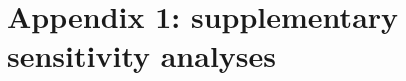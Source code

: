 \documentclass{jimis-en}
\begin{document}

















\appendix\footnotesize

\section{Appendix 1: supplementary sensitivity analyses}





\end{document}
